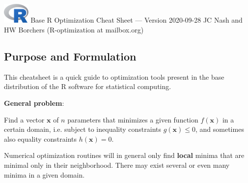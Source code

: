 \documentclass[9pt,a4paper,onecolumn,oneside]{extarticle}
\begin{document}
%
\begin{landscape}

\includegraphics[height=0.4in]{Rlogo.png} 
\hspace{5mm}
\large{Base R Optimization Cheat Sheet --- Version 2020-09-28 \hfill JC Nash and HW Borchers (R-optimization at mailbox.org)}

\begin{multicols}{2}

\section*{\color{darkred} Purpose and Formulation}

This cheatsheet is a quick guide to optimization tools present in the base 
distribution of the R software for statistical computing.

\textbf{General problem}:

Find a vector $\mathbf{x}$ of $n$ parameters that minimizes a given function 
$f(\mathbf{x})$ in a certain domain, i.e. subject to inequality constraints 
$g(\mathbf{x}) \le 0$, and sometimes also equality constraints $h(\mathbf{x}) = 0$.

Numerical optimization routines will in general only find \textbf{local} minima 
that are minimal only in their neighborhood. There may exist several or even 
many minima in a given domain.


\end{multicols}
\end{landscape}
\end{document}
